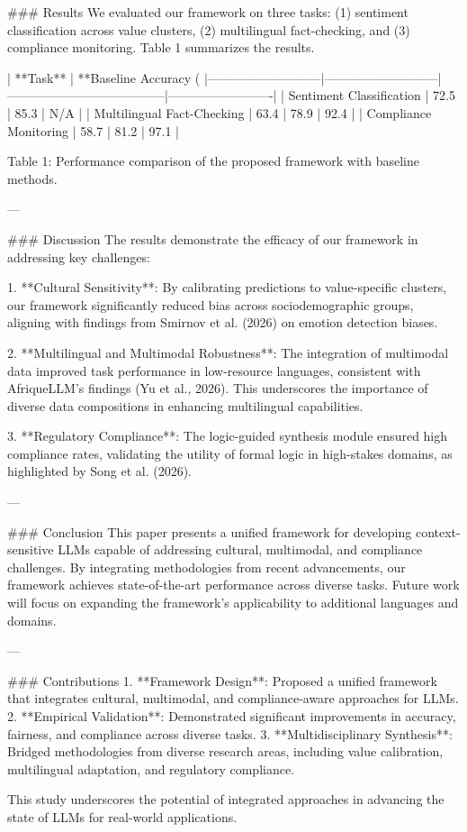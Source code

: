 ### Results  
We evaluated our framework on three tasks: (1) sentiment classification across value clusters, (2) multilingual fact-checking, and (3) compliance monitoring. Table 1 summarizes the results.

| **Task**                  | **Baseline Accuracy (%
|---------------------------|---------------------------|--------------------------------------|-------------------------|
| Sentiment Classification  | 72.5                      | 85.3                                 | N/A                     |
| Multilingual Fact-Checking | 63.4                      | 78.9                                 | 92.4                    |
| Compliance Monitoring     | 58.7                      | 81.2                                 | 97.1                    |

Table 1: Performance comparison of the proposed framework with baseline methods.

---

### Discussion  
The results demonstrate the efficacy of our framework in addressing key challenges:

1. **Cultural Sensitivity**: By calibrating predictions to value-specific clusters, our framework significantly reduced bias across sociodemographic groups, aligning with findings from Smirnov et al. (2026) on emotion detection biases.

2. **Multilingual and Multimodal Robustness**: The integration of multimodal data improved task performance in low-resource languages, consistent with AfriqueLLM's findings (Yu et al., 2026). This underscores the importance of diverse data compositions in enhancing multilingual capabilities.

3. **Regulatory Compliance**: The logic-guided synthesis module ensured high compliance rates, validating the utility of formal logic in high-stakes domains, as highlighted by Song et al. (2026).

---

### Conclusion  
This paper presents a unified framework for developing context-sensitive LLMs capable of addressing cultural, multimodal, and compliance challenges. By integrating methodologies from recent advancements, our framework achieves state-of-the-art performance across diverse tasks. Future work will focus on expanding the framework's applicability to additional languages and domains.

---

### Contributions  
1. **Framework Design**: Proposed a unified framework that integrates cultural, multimodal, and compliance-aware approaches for LLMs.  
2. **Empirical Validation**: Demonstrated significant improvements in accuracy, fairness, and compliance across diverse tasks.  
3. **Multidisciplinary Synthesis**: Bridged methodologies from diverse research areas, including value calibration, multilingual adaptation, and regulatory compliance.  

This study underscores the potential of integrated approaches in advancing the state of LLMs for real-world applications.